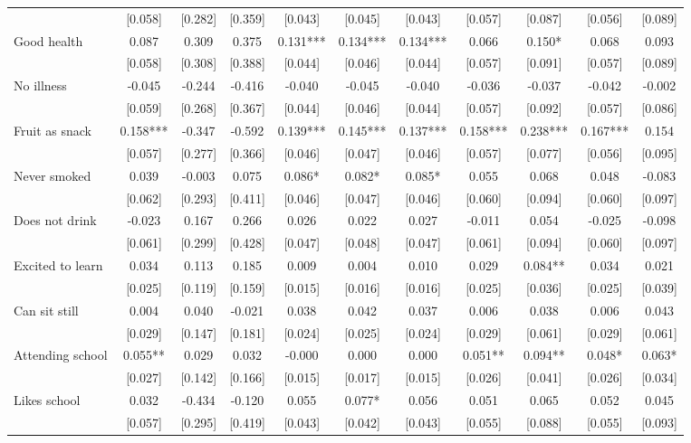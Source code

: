 \documentclass[12pt]{article}
\begin{document}
\begin{table}[ht]
\begin{center}
\begin{adjustbox}{width=1.2\textwidth,center=\textwidth}
\begin{tabular}{l*{10}{c}}
 & [0.058] & [0.282] & [0.359] & [0.043] & [0.045] & [0.043] & [0.057] & [0.087] & [0.056] & [0.089] \\
Good health & 0.087 & 0.309 & 0.375 & 0.131*** & 0.134*** & 0.134*** & 0.066 & 0.150* & 0.068 & 0.093 \\
 & [0.058] & [0.308] & [0.388] & [0.044] & [0.046] & [0.044] & [0.057] & [0.091] & [0.057] & [0.089] \\
No illness & -0.045 & -0.244 & -0.416 & -0.040 & -0.045 & -0.040 & -0.036 & -0.037 & -0.042 & -0.002 \\
 & [0.059] & [0.268] & [0.367] & [0.044] & [0.046] & [0.044] & [0.057] & [0.092] & [0.057] & [0.086] \\
Fruit as snack & 0.158*** & -0.347 & -0.592 & 0.139*** & 0.145*** & 0.137*** & 0.158*** & 0.238*** & 0.167*** & 0.154 \\
 & [0.057] & [0.277] & [0.366] & [0.046] & [0.047] & [0.046] & [0.057] & [0.077] & [0.056] & [0.095] \\
Never smoked & 0.039 & -0.003 & 0.075 & 0.086* & 0.082* & 0.085* & 0.055 & 0.068 & 0.048 & -0.083 \\
 & [0.062] & [0.293] & [0.411] & [0.046] & [0.047] & [0.046] & [0.060] & [0.094] & [0.060] & [0.097] \\
Does not drink & -0.023 & 0.167 & 0.266 & 0.026 & 0.022 & 0.027 & -0.011 & 0.054 & -0.025 & -0.098 \\
 & [0.061] & [0.299] & [0.428] & [0.047] & [0.048] & [0.047] & [0.061] & [0.094] & [0.060] & [0.097] \\
Excited to learn & 0.034 & 0.113 & 0.185 & 0.009 & 0.004 & 0.010 & 0.029 & 0.084** & 0.034 & 0.021 \\
 & [0.025] & [0.119] & [0.159] & [0.015] & [0.016] & [0.016] & [0.025] & [0.036] & [0.025] & [0.039] \\
Can sit still & 0.004 & 0.040 & -0.021 & 0.038 & 0.042 & 0.037 & 0.006 & 0.038 & 0.006 & 0.043 \\
 & [0.029] & [0.147] & [0.181] & [0.024] & [0.025] & [0.024] & [0.029] & [0.061] & [0.029] & [0.061] \\
Attending school & 0.055** & 0.029 & 0.032 & -0.000 & 0.000 & 0.000 & 0.051** & 0.094** & 0.048* & 0.063* \\
 & [0.027] & [0.142] & [0.166] & [0.015] & [0.017] & [0.015] & [0.026] & [0.041] & [0.026] & [0.034] \\
Likes school & 0.032 & -0.434 & -0.120 & 0.055 & 0.077* & 0.056 & 0.051 & 0.065 & 0.052 & 0.045 \\
 & [0.057] & [0.295] & [0.419] & [0.043] & [0.042] & [0.043] & [0.055] & [0.088] & [0.055] & [0.093] \\


\end{tabular}
\end{adjustbox}
\end{center}
\end{table}
\end{document}
